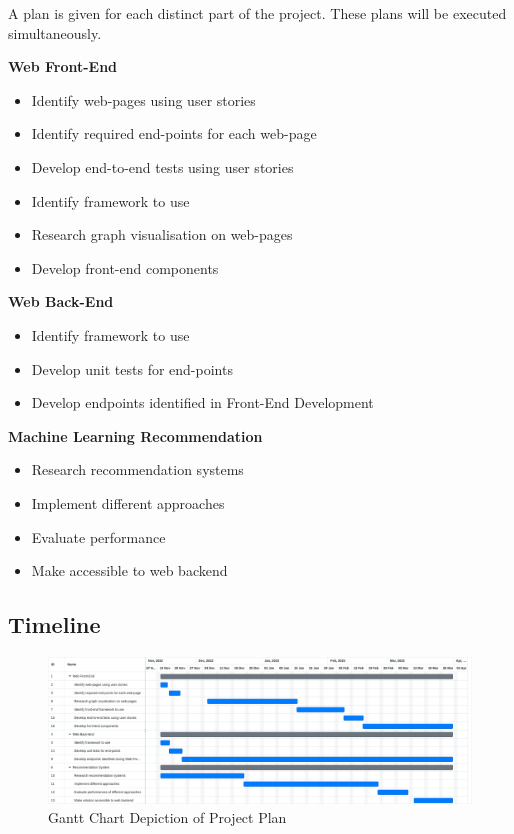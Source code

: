 A plan is given for each distinct part of the project. These plans will be executed simultaneously.


\textbf{Web Front-End}
\begin{itemize}
    \item Identify web-pages using user stories
    \item Identify required end-points for each web-page
    \item Develop end-to-end tests using user stories 
    \item Identify framework to use
    \item Research graph visualisation on web-pages
    \item Develop front-end components
\end{itemize}
\textbf{Web Back-End}
\begin{itemize}
    \item Identify framework to use
    \item Develop unit tests for end-points
    \item Develop endpoints identified in Front-End Development
\end{itemize}
\textbf{Machine Learning Recommendation}
\begin{itemize}
    \item Research recommendation systems
    \item Implement different approaches
    \item Evaluate performance
    \item Make accessible to web backend
\end{itemize}

\subsection{Timeline}


\begin{figure}[htbp]	
	\centerline{
		\includegraphics[width=16.1cm]{../PlanGantt.png}
	}
	\caption{Gantt Chart Depiction of Project Plan}
\end{figure}



